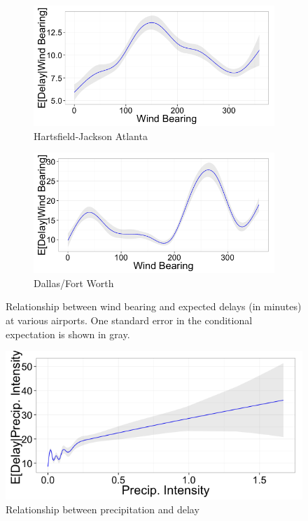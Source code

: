 \documentclass[twocolumn]{article}
\begin{document}
\begin{figure}
\centering
\begin{subfigure}{0.45\textwidth}
    \centering
    \includegraphics[width=\linewidth]{figures/windBearing-ATL.png}
    \caption{Hartsfield-Jackson Atlanta}
\end{subfigure}
\begin{subfigure}{0.45\textwidth}
    \centering
    \includegraphics[width=\linewidth]{figures/windBearing-DFW.png}
    \caption{Dallas/Fort Worth}
\end{subfigure}
\caption{Relationship between wind bearing and expected delays (in minutes) at various airports. One standard error in the conditional expectation is shown in gray.} 
\label{fig:wind-bearing-feature}
\end{figure}

\begin{figure}
    \centering
    \includegraphics[width=\linewidth]{figures/precipIntensity.png}
    \caption{Relationship between precipitation and delay}
    \label{fig:precip-delay-relationship}
\end{figure}
\end{document}
